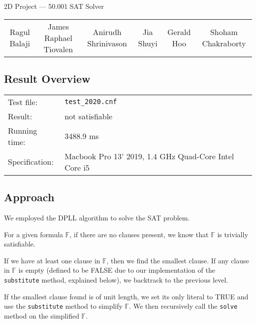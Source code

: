 \documentclass[11pt,fancychapters]{report}
\theoremstyle{definition}
\begin{document}
\centerline{\huge{2D Project --- 50.001 SAT Solver}}

\begin{table}[ht]
\centering
\footnotesize
 \begin{tabular}{c c c c c c} 
Ragul Balaji&James Raphael Tiovalen&Anirudh Shrinivason&Jia Shuyi&Gerald Hoo&Shoham Chakraborty
 \end{tabular}
\end{table}

\subsection*{Result Overview}
\begin{table}[ht]
 \begin{tabular}{l l l} 
Test file: &\texttt{test\_2020.cnf}\\
Result: &not satisfiable\\
Running time: &3488.9 ms\\
Specification: &Macbook Pro 13' 2019, 1.4 GHz Quad-Core Intel Core i5
 \end{tabular}
\end{table}
\subsection*{Approach}
We employed the DPLL algorithm to solve the SAT problem.

For a given formula $\mathbb{F}$, if there are no clauses present, we know that $\mathbb{F}$ is trivially satisfiable.

If we have at least one clause in $\mathbb{F}$, then we find the smallest clause. If any clause in $\mathbb{F}$ is empty (defined to be FALSE due to our implementation of the \texttt{substitute} method, explained below), we backtrack to the previous level. 

If the smallest clause found is of unit length, we set its only literal to TRUE and use the \texttt{substitute} method to simplify $\mathbb{F}$. We then recursively call the \texttt{solve} method on the simplified $\mathbb{F}$.
\end{document}
